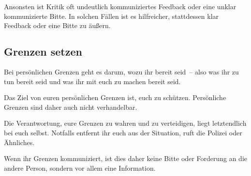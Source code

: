 Ansonsten ist Kritik oft undeutlich kommuniziertes Feedback oder eine unklar kommunizierte Bitte. In solchen Fällen ist es hilfreicher, stattdessen klar Feedback oder eine Bitte zu äußern.


\subsection{Grenzen setzen}

Bei persönlichen Grenzen geht es darum, wozu ihr bereit seid~-- also was ihr zu tun bereit seid und was ihr mit euch zu machen bereit seid.

Das Ziel von euren persönlichen Grenzen ist, euch zu schützen. Persönliche Grenzen sind daher auch nicht verhandelbar.

Die Verantwortung, eure Grenzen zu wahren und zu verteidigen, liegt letztendlich bei euch selbst. Notfalls entfernt ihr euch aus der Situation, ruft die Polizei oder Ähnliches.

Wenn ihr Grenzen kommuniziert, ist dies daher keine Bitte oder Forderung an die andere Person, sondern vor allem eine Information.
